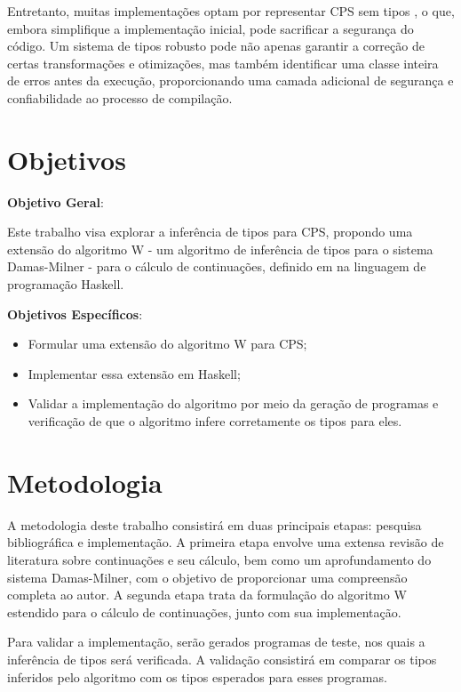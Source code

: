 \documentclass[12pt]{article}
\begin{document}
Entretanto, muitas implementações optam por representar CPS sem tipos \cite{MORRISSET1999}, o que, embora simplifique a implementação inicial, pode sacrificar a segurança do código.
Um sistema de tipos robusto pode não apenas garantir a correção de certas transformações e otimizações, mas também identificar uma classe inteira de erros antes da execução, proporcionando uma camada adicional de segurança e confiabilidade ao processo de compilação.

\section{Objetivos} \label{sec:Objetivos}

\textbf{Objetivo Geral}:

Este trabalho visa explorar a inferência de tipos para CPS, propondo uma extensão do algoritmo W - um algoritmo de inferência de tipos para o sistema Damas-Milner - para o cálculo de continuações, definido em \cite{TORRENS2024} na linguagem de programação Haskell.

\vskip 0.5cm

\noindent\textbf{Objetivos Específicos}:

\begin{itemize}
	\item Formular uma extensão do algoritmo W para CPS;
	\item Implementar essa extensão em Haskell;
	\item Validar a implementação do algoritmo por meio da geração de programas e verificação de que o algoritmo infere corretamente os tipos para eles.
\end{itemize}

\section{Metodologia} \label{sec:Metodologia}

A metodologia deste trabalho consistirá em duas principais etapas: pesquisa bibliográfica e implementação.
A primeira etapa envolve uma extensa revisão de literatura sobre continuações e seu cálculo, bem como um aprofundamento do sistema Damas-Milner, com o objetivo de proporcionar uma compreensão completa ao autor.
A segunda etapa trata da formulação do algoritmo W estendido para o cálculo de continuações, junto com sua implementação.

Para validar a implementação, serão gerados programas de teste, nos quais a inferência de tipos será verificada.
A validação consistirá em comparar os tipos inferidos pelo algoritmo com os tipos esperados para esses programas.
\end{document}
